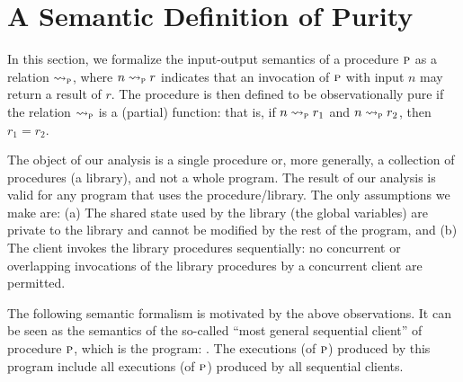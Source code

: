 
\newcommand{\vals}{\mathcal{V}}
\newcommand{\gvars}{G}
\newcommand{\lvars}{L}
\newcommand{\gmap}{\rho_g}
\newcommand{\gmaps}{\Sigma_G}
\newcommand{\lmap}{\rho_\ell}
\newcommand{\lmaps}{\Sigma_L}
\newcommand{\cstates}{S}
\newcommand{\cont}{s}
\newcommand{\lstack}{\gamma}
\newcommand{\initstate}{\sigma_{\text{init}}}

\newcommand{\initial}[1]{\textit{initial}(#1)}
\newcommand{\final}[1]{\textit{final}(#1)}
\newcommand{\inputval}[1]{\textit{input}(#1)}
\newcommand{\outputval}[1]{\textit{output}(#1)}

\newcommand{\extmap}{\sigma_e}


\newcommand{\iosem}[1]{\rightsquigarrow_{#1}}
\newcommand{\iosemP}{\iosem{\proc}}
\newcommand{\sssem}[1]{\rightarrow_{#1}}
\newcommand{\sssemP}{\sssem{\proc}}

\newcommand{\evalsto}[4]{ ({#1} \uplus {#2},{#3}) \Downarrow {#4}}

\newcommand{\labrule}[3]{\inferrule*[Lab={[#1]}]{#2}{#3}}

\section{A Semantic Definition of Purity}

In this section, we formalize the input-output semantics of a procedure $\textsc{p}$ as a relation $\iosem{\proc}$,
where $n \iosem{\proc} r$ indicates that an invocation of $\textsc{p}$ with input $n$ may return a result of $r$.
The procedure is then defined to be observationally pure if the relation $\iosem{\proc}$ is a (partial) function:
that is, if  $n \iosem{\proc} r_1$ and $n \iosem{\proc} r_2$, then $r_1 = r_2$.

The object of our analysis is a single procedure or, more generally, a collection of procedures (a library),
and not a whole program. The result of our analysis is valid for any program that uses the procedure/library.
The only assumptions we make are: (a) The shared state used by the library (the global variables) are private
to the library and cannot be modified by the rest of the program, and (b) The client invokes the library
procedures sequentially: no concurrent or overlapping invocations of the library procedures by a concurrent
client are permitted.

The following semantic formalism is motivated by the above observations. It can be seen as the semantics
of the so-called ``most general sequential client'' of procedure $\textsc{p}$, which is the program:
.
The executions (of $\textsc{p}$) produced by this program include all executions (of $\textsc{p}$)  produced by all
sequential clients.

